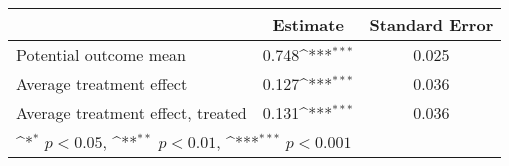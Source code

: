 \def\sym#1{\ifmmode^{#1}\else\(^{#1}\)\fi}
\begin{tabular}{lcc} \hline \hline
                                  &  Estimate & Standard Error      \\ \hline
Potential outcome mean            & 0.748\sym{***}     & 0.025      \\
Average treatment effect          & 0.127\sym{***}     & 0.036      \\
Average treatment effect, treated & 0.131\sym{***}     & 0.036      \\ \hline
\multicolumn{3}{l}{\footnotesize \sym{*} \(p<0.05\), \sym{**} \(p<0.01\), \sym{***} \(p<0.001\)}\\
\hline \hline
\end{tabular}